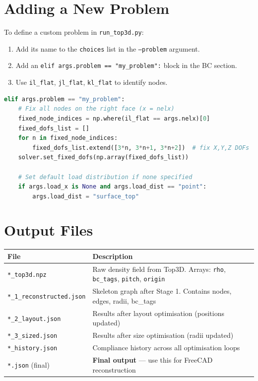 \documentclass[11pt,a4paper]{article}
\begin{document}
\section{Adding a New Problem}

To define a custom problem in \texttt{run\_top3d.py}:
\begin{enumerate}
    \item Add its name to the \texttt{choices} list in the \texttt{--problem} argument.
    \item Add an \texttt{elif args.problem == "my\_problem":} block in the BC section.
    \item Use \texttt{il\_flat}, \texttt{jl\_flat}, \texttt{kl\_flat} to identify nodes.
\end{enumerate}

\begin{lstlisting}[language=python, caption=Custom BC snippet]
elif args.problem == "my_problem":
    # Fix all nodes on the right face (x = nelx)
    fixed_node_indices = np.where(il_flat == args.nelx)[0]
    fixed_dofs_list = []
    for n in fixed_node_indices:
        fixed_dofs_list.extend([3*n, 3*n+1, 3*n+2])  # fix X,Y,Z DOFs
    solver.set_fixed_dofs(np.array(fixed_dofs_list))

    # Set default load distribution if none specified
    if args.load_x is None and args.load_dist == "point":
        args.load_dist = "surface_top"
\end{lstlisting}

\section{Output Files}

\begin{table}[h]
\centering
\begin{tabularx}{\textwidth}{lX}
\toprule
\textbf{File} & \textbf{Description} \\
\midrule
\texttt{*\_top3d.npz} & Raw density field from Top3D. Arrays: \texttt{rho}, \texttt{bc\_tags}, \texttt{pitch}, \texttt{origin} \\
\texttt{*\_1\_reconstructed.json} & Skeleton graph after Stage 1. Contains nodes, edges, radii, bc\_tags \\
\texttt{*\_2\_layout.json} & Results after layout optimisation (positions updated) \\
\texttt{*\_3\_sized.json} & Results after size optimisation (radii updated) \\
\texttt{*\_history.json} & Compliance history across all optimisation loops \\
\texttt{*.json} (final) & \textbf{Final output} — use this for FreeCAD reconstruction \\
\bottomrule
\end{tabularx}
\end{table}
\end{document}
